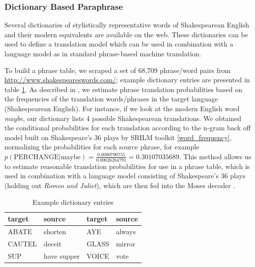 \documentclass[10pt,a5paper,twoside]{article}
\begin{document}
\subsubsection{Dictionary Based Paraphrase}
\label{dictionary_baseline}
Several dictionaries of stylistically representative words of Shakespearean English and their modern equivalents are available on the web.  
These dictionaries can be used to define a translation model which can be used in combination with a language model as in standard phrase-based machine
translation.


To build a phrase table, we scraped a set of 68,709 phrase/word pairs from \url{http://www.shakespeareswords.com/}; 
example dictionary entries are presented in table \ref{dictionary_example}. 
As described in \cite{Koehn00}, we estimate phrase translation probabilities
based on the frequencies of the translation words/phrases in the target language (Shakespearean English).
For instance, if we look at the modern English word \emph{maybe}, our dictionary lists 4 possible Shakespearean translations. 
We obtained the conditional probabilities for each translation according to the n-gram back off model built on Shakespeare's 
36 plays by SRILM toolkit \cite{Stolcke02} \ref{word_frequency}, 
normalizing the probabilities for each source phrase, for example $p(\text{PERCHANGE}|\text{maybe}) = \frac{0.0000790755}{0.00026264791} = 0.30107035689$. 
This method allows us to estimate reasonable translation probabilities for use in a phrase table, which is used in combination 
with a language model consisting of Shakespeare's 36 plays (holding out {\em Romeo and Juliet}), which are then fed into the Moses decoder
\cite{Koehn07}.

\begin{table}
  \begin{center}
  \begin{tabular}{|l|l||l|l|}
    \hline
    target & source & target & source \\
    \hline
    \hline
    ABATE & shorten & AYE & always \\
    \hline
    CAUTEL & deceit & GLASS & mirror \\
    \hline
    SUP & have supper & VOICE & vote \\
    \hline
  \end{tabular}
  \end{center}
  \caption{Example dictionary entries}
  \label{dictionary_example}
\end{table}
\end{document}
